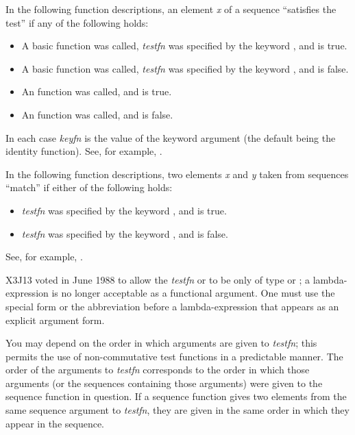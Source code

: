 In the following function descriptions, an element {\it x} of a sequence
``satisfies the test'' if any of the following holds:
\begin{itemize}
\item
A basic function was called,
{\it testfn} was specified by the keyword , and
 is true.

\item
A basic function was called,
{\it testfn} was specified by the keyword , and
 is false.

\item
An  function was called, and
 is true.

\item
An  function was called, and
 is false.
\end{itemize}
In each case {\it keyfn} is the
value of the  keyword argument (the default being the identity
function).  See, for example, .

In the following function descriptions,
two elements {\it x} and {\it y} taken from sequences ``match'' if
either of the following holds:
\begin{itemize}
\item
{\it testfn} was specified by the keyword , and
 is true.

\item
{\it testfn} was specified by the keyword , and
 is false.
\end{itemize}
See, for example, .

\begin{newer}
X3J13 voted in June 1988  to allow the {\it testfn}
or 
to be only of type  or ; a lambda-expression
is no longer acceptable as a functional argument.  One must use the
 special form or the abbreviation  before
a lambda-expression that appears as an  explicit argument form.
\end{newer}

You may depend on the order in which arguments
are given to {\it testfn}; this permits the use of non-commutative
test functions in a predictable manner.
The order of the arguments to {\it testfn} corresponds
to the order in which those arguments (or the sequences containing
those arguments)
were given to the sequence function in question.
If a sequence function gives two elements from the same
sequence argument to {\it testfn}, they are given in the same order in
which they appear in the sequence.

